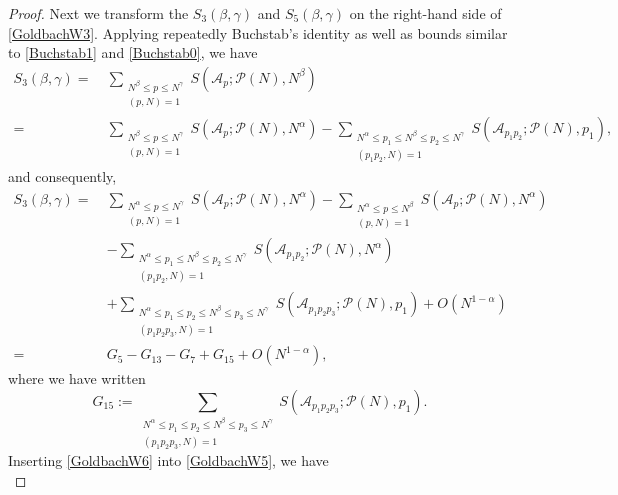 \documentclass[12pt, a4paper]{amsart}
\def\leq{\leqslant}
\def\le{\leqslant}
\theoremstyle{plain}
\theoremstyle{remark}
\numberwithin{equation}{section}
\begin{document}
\begin{proof}
Next we transform the $S_3(\beta,\gamma)$ and $S_5(\beta,\gamma)$ on the right-hand side of \eqref{GoldbachW3}.  
Applying repeatedly Buchstab's identity as well as bounds similar to \eqref{Buchstab1} and \eqref{Buchstab0}, 
we have
\begin{equation*}
\begin{split}
S_3(\beta,\gamma)=\ &\sum_{\substack{N^\beta \le p \le N^\gamma \\ (p, N) = 1}} S(\mathscr{A}_p; \mathscr{P}(N), N^\beta)\\
=\ & \sum_{\substack{N^\beta \le p \le N^\gamma \\ (p, N) = 1}} S(\mathscr{A}_p; \mathscr{P}(N), N^\alpha)-\sum_{\substack{N^{\alpha} \leq p_1 \le N^{\beta} \le p_2 \le N^{\gamma} \\ (p_1 p_2, N) = 1}} S(\mathscr{A}_{p_1 p_2}; \mathscr{P}(N), p_1), 
\end{split}
\end{equation*}
and consequently,  
\begin{equation}\label{GoldbachW6}
\begin{split}
S_3(\beta,\gamma)
=\ & \sum_{\substack{N^\alpha \le p \le N^\gamma \\ (p, N) = 1}} S(\mathscr{A}_p; \mathscr{P}(N), N^\alpha)-\sum_{\substack{N^\alpha \le p \le N^\beta \\ (p, N) = 1}} S(\mathscr{A}_p; \mathscr{P}(N), N^\alpha)\\
&-\sum_{\substack{N^{\alpha} \leq p_1 \le N^{\beta} \le p_2 \le N^{\gamma} \\ (p_1 p_2, N) = 1}} S(\mathscr{A}_{p_1 p_2}; \mathscr{P}(N), N^{\alpha})\\
&+\sum_{\substack{N^{\alpha} \leq p_1 \le p_2 \le N^{\beta} \leq p_3 \le N^{\gamma}\\ (p_1 p_2 p_3, N) = 1}} S(\mathscr{A}_{p_1 p_2 p_3}; \mathscr{P}(N), p_1)+O(N^{1-\alpha})\\
=\ &G_5-G_{13}-G_{7}+G_{15}+O(N^{1-\alpha}),
\end{split}
\end{equation}
where we have written 
\begin{equation}
G_{15}:=\sum_{\substack{N^{\alpha} \leq p_1 \le p_2 \le N^{\beta} \leq p_3 \le N^{\gamma}\\ (p_1 p_2 p_3, N) = 1}} S(\mathscr{A}_{p_1 p_2 p_3}; \mathscr{P}(N), p_1). 
\end{equation}
Inserting \eqref{GoldbachW6} into \eqref{GoldbachW5}, we have
\begin{equation}\label{GoldbachW7}

\end{equation}
\end{proof}
\end{document}
